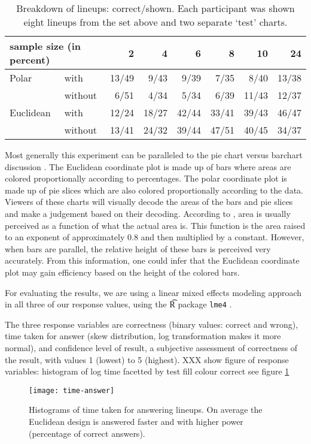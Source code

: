 \begin{table}[hbtp]
\resizebox{\linewidth}{!} {
	\begin{tabular}{ll|@{}r|@{}r|@{}r|@{}r|@{}r|@{}r}
	\multicolumn{2}{l}{sample size (in percent)}  & 2 & 4 & 6 & 8 & 10 & 24 \\ [1pt] \hline
	Polar & with & 13/49& 9/43 & 9/39 & 7/35 & 8/40 & 13/38 \\
	& without & 6/51&   4/34 &  5/34 &  6/39 & 11/43 &  12/37\\ [1pt] \hline
	Euclidean & with &12/24& 18/27 & 42/44 & 33/41 & 39/43 & 46/47\\
	& without & 13/41 &24/32& 39/44 & 47/51 & 40/45 & 34/37\\
	\end{tabular}
	}
\caption{\label{tbl:treatment} Breakdown of lineups: correct/shown. Each participant was shown eight lineups from the set above and two separate `test' charts.}
\end{table}

Most generally this experiment can be paralleled to the pie chart versus barchart discussion \cite{***}. 
The Euclidean coordinate plot is made up of bars where areas are colored proportionally according to percentages. The polar coordinate plot is made up of pie slices which are also colored proportionally according to the data. 
Viewers of these charts will visually decode the areas of the bars and pie slices and make a judgement based on their decoding. According to  \citet[page=40]{kosslyn:2006}, area is usually perceived as a function of what the actual area is. This function is the area raised to an exponent of approximately 0.8 and then multiplied by a constant. However, when bars are parallel, the relative height of these bars is perceived very accurately. From this information, one could infer that the Euclidean coordinate plot may gain efficiency based on the height of the colored bars. 


For evaluating the results, we are using a linear mixed effects modeling \cite{pinheiro:2000} approach in all three of our response values, using the {\t R} package {\tt lme4} \cite{bates:2011}. 

The three response variables are correctness (binary values: correct and wrong),  time taken for answer (skew distribution, log transformation makes it more normal), and confidence level of result, a subjective assessment of correctness of the result, with values 1 (lowest) to 5 (highest).
XXX show figure of response variables: histogram of log time facetted by test fill colour correct see figure \ref{fig:time}
\begin{figure}[htbp] %
   \centering
   \texttt{[image: time-answer]} 
   \caption{Histograms of time taken for answering lineups. On average the Euclidean design is answered faster and with higher power (percentage of correct answers). }
   \label{fig:time}
\end{figure}

